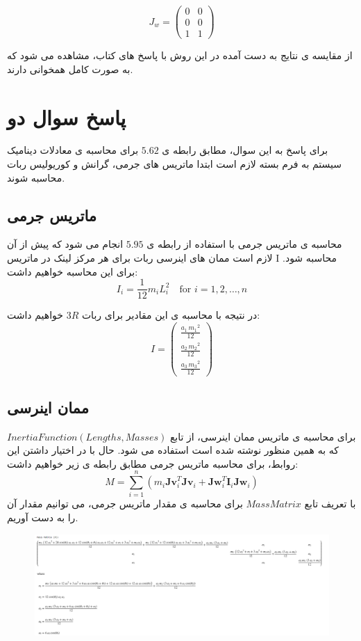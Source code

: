\[
J_w = 
\left(\begin{array}{cc}
	0 & 0 \\
	0 & 0 \\
	1 & 1
\end{array}\right)
\]

از مقایسه ی نتایج به دست آمده در این روش با پاسخ های کتاب، مشاهده می شود که به صورت کامل همخوانی دارند.
\section*{پاسخ سوال دو}
برای پاسخ به این سوال، مطابق رابطه ی $5.62$ برای محاسبه ی معادلات دینامیک سیستم به فرم بسته لازم است ابتدا ماتریس های جرمی، گرانش و کوریولیس ربات محاسبه شوند. 
\subsection*{ماتریس جرمی}
محاسبه ی ماتریس جرمی با استفاده از رابطه ی $5.95$ انجام می شود که پیش از آن لازم است ممان های اینرسی ربات برای هر مرکز لینک در ماتریس I محاسبه شود.
برای این محاسبه خواهیم داشت:
\[
I_i = \frac{1}{12} m_i L_i^2 \quad \text{for } i = 1, 2, \ldots, n
\]

در نتیجه با محاسبه ی این مقادیر برای ربات $3R$ خواهیم داشت:
\[
I = 
\left(\begin{array}{c}
	\frac{a_1 \,{m_1 }^2 }{12} \\
	\frac{a_2 \,{m_2 }^2 }{12} \\
	\frac{a_3 \,{m_3 }^2 }{12}
\end{array}\right)
\]
\subsection*{ممان اینرسی}
برای محاسبه ی ماتریس ممان اینرسی، از تابع $Inertia Function(Lengths, Masses)$ که به همین منظور نوشته شده است استفاده می شود.
حال با در اختیار داشتن این روابط، برای محاسبه ماتریس جرمی مطابق رابطه ی زیر خواهیم داشت:
\[
M = \sum_{i=1}^{n} \left( m_i \mathbf{Jv}_i^T \mathbf{Jv}_i + \mathbf{Jw}_i^T \mathbf{I}_i \mathbf{Jw}_i \right)
\]
با تعریف تابع $Mass Matrix$ برای محاسبه ی مقدار ماتریس جرمی، می توانیم مقدار آن را به دست آوریم. 
\begin{figure}[!h]
	\centering
	\includegraphics[width=1\linewidth]{../img/screenshot001}
	\caption{}
	\label{fig:screenshot001}
\end{figure}
